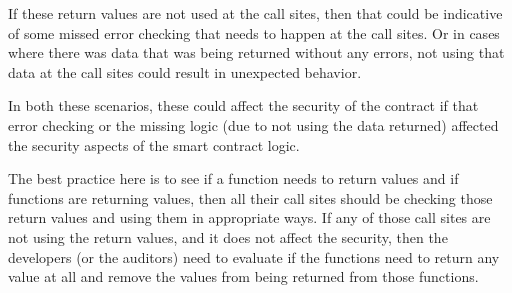 If these return values are not used at the call sites, then that could
be indicative of some missed error checking that needs to happen at the
call sites. Or in cases where there was data that was being returned
without any errors, not using that data at the call sites could result
in unexpected behavior.

In both these scenarios, these could affect the security of the contract
if that error checking or the missing logic (due to not using the data
returned) affected the security aspects of the smart contract logic.

The best practice here is to see if a function needs to return values
and if functions are returning values, then all their call sites should
be checking those return values and using them in appropriate ways. If
any of those call sites are not using the return values, and it does not
affect the security, then the developers (or the auditors) need to
evaluate if the functions need to return any value at all and remove the
values from being returned from those functions.
